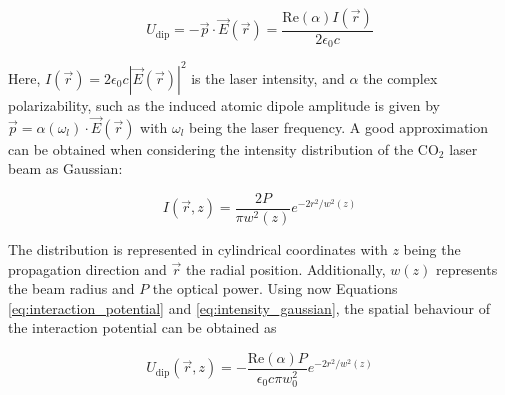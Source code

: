 \begin{equation}\label{eq:interaction_potential}
	U_{\text{dip}} = -\vec{p} \cdot \vec{E}(\vec{r}) = \frac{\text{Re}(\alpha) I(\vec{r})}{2 \epsilon_0 c} 
\end{equation}

Here, $I(\vec{r}) = 2 \epsilon_0 c |\vec{E}(\vec{r})|^2$ is the laser intensity, and $\alpha$ the complex polarizability, such as the induced atomic dipole amplitude is given by $\vec{p} = \alpha(\omega_l) \cdot \vec{E}(\vec{r})$ with $\omega_l$ being the laser frequency. A good approximation can be obtained when considering the intensity distribution of the $\text{CO}_2$ laser beam as Gaussian:

\begin{equation}\label{eq:intensity_gaussian}
	I(\vec{r}, z) = \frac{2P}{\pi w^2(z)} e^{-2r^2/w^2(z)}
\end{equation}

The distribution is represented in cylindrical coordinates with $z$ being the propagation direction and $\vec{r}$ the radial position. Additionally, $w(z)$ represents the beam radius and $P$ the optical power. Using now Equations \eqref{eq:interaction_potential} and \eqref{eq:intensity_gaussian}, the spatial behaviour of the interaction potential can be obtained as

\begin{equation}
	U_{\text{dip}}(\vec{r}, z) = -\frac{\text{Re}(\alpha) P}{\epsilon_0 c \pi w_0^2} e^{-2r^2/w^2(z)}
\end{equation}


